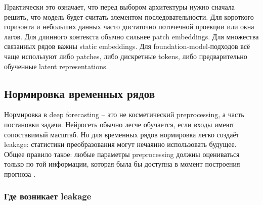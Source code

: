 \documentclass[12pt,fleqn]{article}
\begin{document}
Практически это означает, что перед выбором архитектуры нужно сначала решить, что модель будет считать элементом последовательности.
Для короткого горизонта и небольших данных часто достаточно поточечной проекции или окна лагов.
Для длинного контекста обычно сильнее patch embeddings.
Для множества связанных рядов важны static embeddings.
Для foundation-model-подходов всё чаще используют либо patches, либо дискретные tokens, либо предварительно обученные latent representations.

\subsection{Нормировка временных рядов}

Нормировка в deep forecasting -- это не косметический preprocessing, а часть постановки задачи.
Нейросеть обычно легче обучается, если входы имеют сопоставимый масштаб.
Но для временных рядов нормировка легко создаёт leakage: статистики преобразования могут нечаянно использовать будущее.
Общее правило такое: любые параметры preprocessing должны оцениваться только по той информации, которая была бы доступна в момент построения прогноза \cite{sklearnCommonPitfalls}.

\subsubsection{Где возникает leakage}
\end{document}
